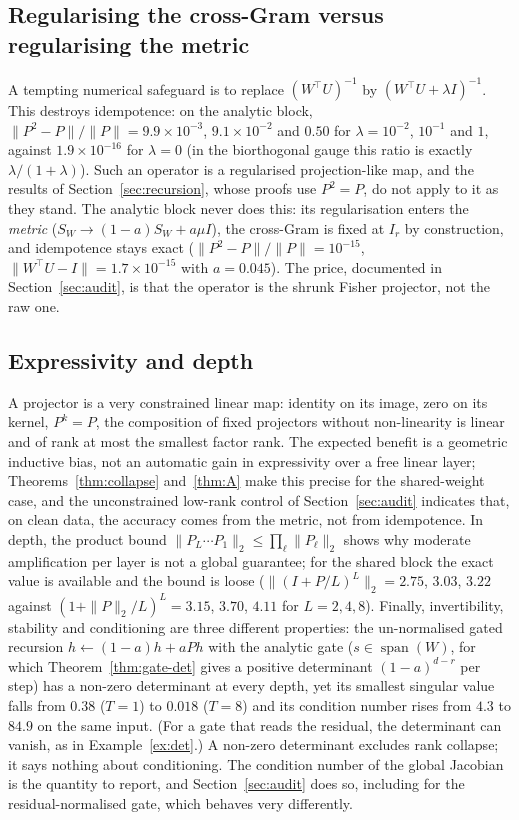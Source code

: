 \documentclass[11pt,a4paper]{article}
\theoremstyle{plain}
\theoremstyle{definition}
\theoremstyle{remark}
\newcommand{\spn}{\operatorname{span}}
\newcommand{\T}{\top}
\begin{document}
\subsection{Regularising the cross-Gram versus regularising the metric}
A tempting numerical safeguard is to replace $(W^\T U)^{-1}$ by
$(W^\T U+\lambda I)^{-1}$. This destroys idempotence: on the analytic
block, $\|P^2-P\|/\|P\|=9.9\times10^{-3}$, $9.1\times10^{-2}$ and
$0.50$ for $\lambda=10^{-2}$, $10^{-1}$ and $1$, against $1.9\times10^{-16}$
for $\lambda=0$ (in the biorthogonal gauge this ratio is exactly
$\lambda/(1+\lambda)$). Such an operator is a regularised projection-like
map, and the results of Section~\ref{sec:recursion}, whose proofs use
$P^2=P$, do not apply to it as they stand. The analytic block never does this: its
regularisation enters the \emph{metric} ($S_W\to(1-a)S_W+a\mu I$), the
cross-Gram is fixed at $I_r$ by construction, and idempotence stays exact
($\|P^2-P\|/\|P\|=10^{-15}$, $\|W^\T U-I\|=1.7\times10^{-15}$ with
$a=0.045$). The price, documented in Section~\ref{sec:audit}, is that the
operator is the shrunk Fisher projector, not the raw one.

\subsection{Expressivity and depth}
A projector is a very constrained linear map: identity on its image, zero on
its kernel, $P^k=P$, the composition of fixed projectors without
non-linearity is linear and of rank at most the smallest factor rank. The
expected benefit is a geometric inductive bias, not an automatic gain in
expressivity over a free linear layer; Theorems~\ref{thm:collapse}
and~\ref{thm:A} make this precise for the shared-weight case, and the
unconstrained low-rank control of Section~\ref{sec:audit} indicates that, on
clean data, the accuracy comes from the metric, not from idempotence. In depth, the product
bound $\|P_L\cdots P_1\|_2\le\prod_\ell\|P_\ell\|_2$ shows why moderate
amplification per layer is not a global guarantee; for the shared block the
exact value is available and the bound is loose
($\|(I+P/L)^L\|_2=2.75$, $3.03$, $3.22$ against $(1+\|P\|_2/L)^L=3.15$,
$3.70$, $4.11$ for $L=2,4,8$). Finally, invertibility, stability and
conditioning are three different properties: the un-normalised gated
recursion $h\leftarrow(1-a)h+aPh$ with the analytic gate ($s\in\spn(W)$,
for which Theorem~\ref{thm:gate-det} gives a positive determinant
$(1-a)^{d-r}$ per step) has a non-zero determinant at every depth, yet its
smallest singular value falls from $0.38$ ($T=1$) to $0.018$ ($T=8$) and its
condition number rises from $4.3$ to $84.9$ on the same input. (For a gate
that reads the residual, the determinant can vanish, as in
Example~\ref{ex:det}.) A non-zero determinant excludes rank collapse; it
says nothing about conditioning. The condition number of the global
Jacobian is the quantity to report, and Section~\ref{sec:audit} does so,
including for the residual-normalised gate, which behaves very
differently.
\end{document}
